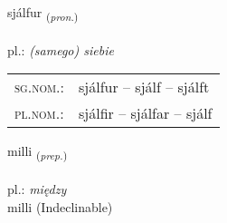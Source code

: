 \documentclass[frontgrid, backgrid]{flacards}\usepackage[]{graphicx}\usepackage[]{xcolor}
\begin{document}
\renewcommand{\blhead}{\vskip5pt {\small\bfseries\footnotesize Fornafn | zaimek }}
\renewcommand{\bcfoot}{\vskip5pt \hspace{2pt}{\small\bfseries\footnotesize 1K}}


{sjálfur \small{\textsubscript{(\textit{pron.})}} \\[1ex] %
\textphonetic{[sjaulvʏr]} \\
pl.: \emph{(samego) siebie} \\  [2ex]
\renewcommand*{\arraystretch}{0.8}
\begin{tabular}{ll}
\textsc{sg.nom.}: & sjálfur  --  sjálf -- sjálft \\ 
\textsc{pl.nom.}: & sjálfir -- sjálfar -- sjálf
\end{tabular}
}


\renewcommand{\flhead}{\vskip5pt \fboxsep=0pt {\small\bfseries\footnotesize Forsetning | przyimek}}
\renewcommand{\fcfoot}{\vskip5pt \fboxsep=0pt \hspace{2pt}{\small\bfseries\footnotesize 1K}}

\renewcommand{\blhead}{\vskip5pt {\small\bfseries\footnotesize Forsetning | przyimek }}
\renewcommand{\bcfoot}{\vskip5pt \hspace{2pt}{\small\bfseries\footnotesize 1K}}


{milli \small{\textsubscript{(\textit{prep.})}} \\[1ex]
\textphonetic{[mɪtlɪ]} \\
pl.: \emph{między} \\  [2ex]
milli (Indeclinable)}


\renewcommand{\flhead}{\vskip5pt \fboxsep=0pt {\small\bfseries\footnotesize Forsetning | przyimek}}
\renewcommand{\fcfoot}{\vskip5pt \fboxsep=0pt \hspace{2pt}{\small\bfseries\footnotesize 1K}}

\renewcommand{\blhead}{\vskip5pt {\small\bfseries\footnotesize Forsetning | przyimek }}
\renewcommand{\bcfoot}{\vskip5pt \hspace{2pt}{\small\bfseries\footnotesize 1K}}
\end{document}
